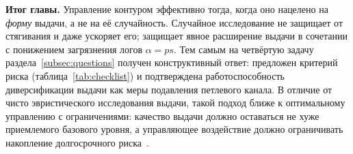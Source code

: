 \textbf{Итог главы.} Управление контуром эффективно тогда, когда оно нацелено на
\emph{форму} выдачи, а не на её случайность. Случайное исследование не защищает
от стягивания и даже ускоряет его; защищает явное расширение выдачи в сочетании
с понижением загрязнения логов $\alpha=ps$. Тем самым на четвёртую задачу
раздела~\ref{subsec:questions} получен конструктивный ответ: предложен критерий
риска (таблица~\ref{tab:checklist}) и подтверждена работоспособность диверсификации
выдачи как меры подавления петлевого канала. В отличие от чисто эвристического
исследования выдачи, такой подход ближе к оптимальному управлению с ограничениями:
качество выдачи
должно оставаться не хуже приемлемого базового уровня, а управляющее воздействие
должно ограничивать накопление долгосрочного риска~\cite{chow2014baselineControl,
mariano2026optimalControl}.
